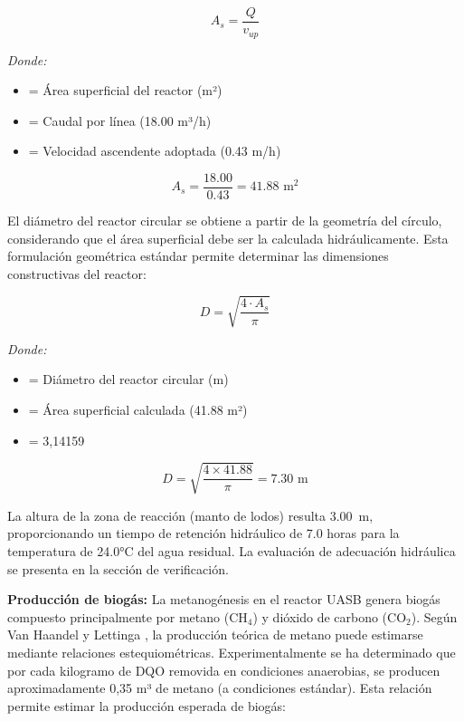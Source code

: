 \documentclass[12pt,a4paper]{article}
\newcommand{\captionequation}[1]{}  %
\begin{document}
\begin{equation}
A_s = \frac{Q}{v_{up}}
\end{equation}
\captionequation{Area superficial del reactor UASB}

\textit{Donde:}
\begin{itemize}[noitemsep,leftmargin=2em]
    \item[$A_s$] = Área superficial del reactor (m²)
    \item[$Q$] = Caudal por línea (18.00 m³/h)
    \item[$v_{up}$] = Velocidad ascendente adoptada (0.43 m/h)
\end{itemize}

\begin{equation}
A_s = \frac{18.00}{0.43} = 41.88 \text{ m}^2
\end{equation}

El diámetro del reactor circular se obtiene a partir de la geometría del círculo, considerando que el área superficial debe ser la calculada hidráulicamente. Esta formulación geométrica estándar permite determinar las dimensiones constructivas del reactor:

\begin{equation}
D = \sqrt{\frac{4 \cdot A_s}{\pi}}
\end{equation}
\captionequation{Diametro del reactor circular - Geometria basica}

\textit{Donde:}
\begin{itemize}[noitemsep,leftmargin=2em]
    \item[$D$] = Diámetro del reactor circular (m)
    \item[$A_s$] = Área superficial calculada (41.88 m²)
    \item[$\pi$] = 3,14159
\end{itemize}

\begin{equation}
D = \sqrt{\frac{4 \times 41.88}{\pi}} = 7.30 \text{ m}
\end{equation}

La altura de la zona de reacción (manto de lodos) resulta 3.00~m, proporcionando un tiempo de retención hidráulico de 7.0 horas para la temperatura de 24.0°C del agua residual. La evaluación de adecuación hidráulica se presenta en la sección de verificación.

\textbf{Producción de biogás:} La metanogénesis en el reactor UASB genera biogás compuesto principalmente por metano (CH$_4$) y dióxido de carbono (CO$_2$). Según Van Haandel y Lettinga \cite{vanhaandel1994}, la producción teórica de metano puede estimarse mediante relaciones estequiométricas. Experimentalmente se ha determinado que por cada kilogramo de DQO removida en condiciones anaerobias, se producen aproximadamente 0,35 m³ de metano (a condiciones estándar). Esta relación permite estimar la producción esperada de biogás:
\end{document}
